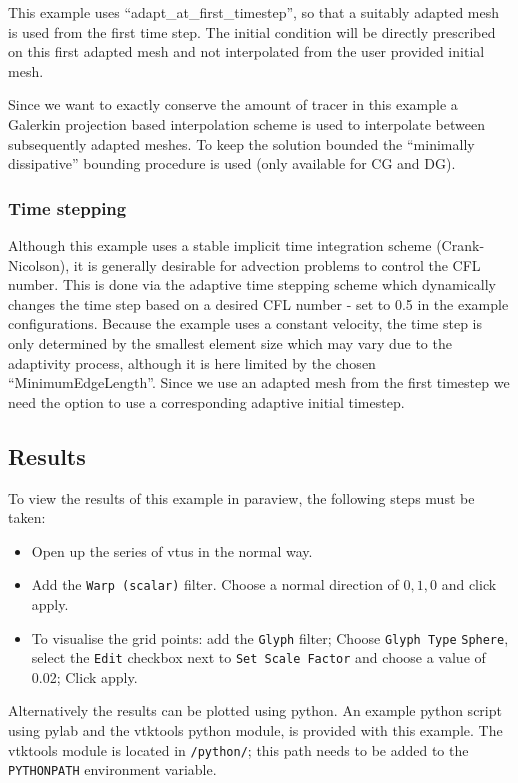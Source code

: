 This example uses ``adapt\_at\_first\_timestep'', so that a suitably
adapted mesh is used from the first time step. The initial condition
will be directly prescribed on this first adapted mesh and not interpolated
from the user provided initial mesh.

Since we want to exactly conserve the amount of tracer in this example
a Galerkin projection based interpolation scheme is used to interpolate
between subsequently adapted meshes. To keep the solution bounded the
``minimally dissipative'' bounding procedure is used (only available for CG and DG).

\subsubsection{Time stepping}
Although this example uses a stable implicit time integration scheme (Crank-Nicolson),
it is generally desirable for advection problems to control the CFL number. This is done
via the adaptive time stepping scheme which dynamically changes the time 
step based on a desired CFL number - set to 0.5 in the example configurations. Because the 
example uses a constant velocity, the time step is only determined by the smallest 
element size which may vary due to the adaptivity process, although it is here
limited by the chosen ``MinimumEdgeLength''. Since we use an adapted mesh from the first 
timestep we need the option  to use a corresponding 
adaptive initial timestep.

\subsection{Results}
To view the results of this example in paraview, the following steps
must be taken:
\begin{itemize}
\item Open up the series of vtus in the normal way.
\item Add the \texttt{Warp (scalar)} filter. Choose a normal direction of $0,1,0$ and click apply.
\item To visualise the grid points: add the \texttt{Glyph} filter; Choose \texttt{Glyph Type} \texttt{Sphere},
select the \texttt{Edit} checkbox next to \texttt{Set Scale Factor} and choose a value of 0.02; Click apply.
\end{itemize}

Alternatively the results can be plotted using python. An example python script using pylab and the 
vtktools python module, is provided with this example. The vtktools module is located in 
\texttt{\fluiditysourcepath/python/}; this path needs to be added to the \texttt{PYTHONPATH} environment
variable.

